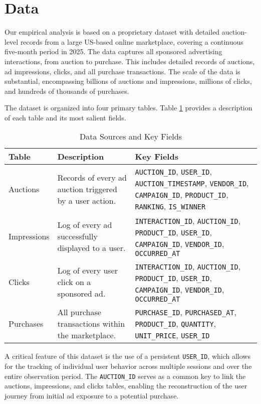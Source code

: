 \section*{Data}

Our empirical analysis is based on a proprietary dataset with detailed auction-level records from a large US-based online marketplace, covering a continuous five-month period in 2025. The data captures all sponsored advertising interactions, from auction to purchase. This includes detailed records of auctions, ad impressions, clicks, and all purchase transactions. The scale of the data is substantial, encompassing billions of auctions and impressions, millions of clicks, and hundreds of thousands of purchases.

The dataset is organized into four primary tables. Table \ref{tab:data_structure} provides a description of each table and its most salient fields.

\begin{table}[htbp!]
\centering
\caption{Data Sources and Key Fields}
\label{tab:data_structure}
\begin{tabular}{p{} p{} p{}}
\toprule
Table & Description & Key Fields \\
\midrule
Auctions & Records of every ad auction triggered by a user action. & \texttt{AUCTION\_ID}, \texttt{USER\_ID}, \texttt{AUCTION\_TIMESTAMP}, \texttt{VENDOR\_ID}, \texttt{CAMPAIGN\_ID}, \texttt{PRODUCT\_ID}, \texttt{RANKING}, \texttt{IS\_WINNER} \\
Impressions & Log of every ad successfully displayed to a user. & \texttt{INTERACTION\_ID}, \texttt{AUCTION\_ID}, \texttt{PRODUCT\_ID}, \texttt{USER\_ID}, \texttt{CAMPAIGN\_ID}, \texttt{VENDOR\_ID}, \texttt{OCCURRED\_AT} \\
Clicks & Log of every user click on a sponsored ad. & \texttt{INTERACTION\_ID}, \texttt{AUCTION\_ID}, \texttt{PRODUCT\_ID}, \texttt{USER\_ID}, \texttt{CAMPAIGN\_ID}, \texttt{VENDOR\_ID}, \texttt{OCCURRED\_AT} \\
Purchases & All purchase transactions within the marketplace. & \texttt{PURCHASE\_ID}, \texttt{PURCHASED\_AT}, \texttt{PRODUCT\_ID}, \texttt{QUANTITY}, \texttt{UNIT\_PRICE}, \texttt{USER\_ID} \\
\bottomrule
\end{tabular}
\end{table}

A critical feature of this dataset is the use of a persistent \texttt{USER\_ID}, which allows for the tracking of individual user behavior across multiple sessions and over the entire observation period. The \texttt{AUCTION\_ID} serves as a common key to link the auctions, impressions, and clicks tables, enabling the reconstruction of the user journey from initial ad exposure to a potential purchase.

